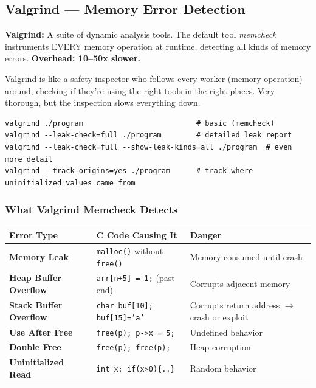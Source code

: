 \documentclass[11pt,a4paper]{article}
\newcommand{\code}[1]{\texttt{\small\colorbox{codebg}{\color{codekw}#1}}}
\newcommand{\term}[1]{\textbf{\color{darkblue}#1}}
\begin{document}
\subsection{Valgrind --- Memory Error Detection}

\begin{mydef}
\textbf{Valgrind:} A suite of dynamic analysis tools. The default tool \textit{memcheck} instruments EVERY memory operation at runtime, detecting all kinds of memory errors. \textbf{Overhead: 10--50x slower.}
\end{mydef}

\begin{analogy}
Valgrind is like a safety inspector who follows every worker (memory operation) around, checking if they're using the right tools in the right places. Very thorough, but the inspection slows everything down.
\end{analogy}

\begin{lstlisting}[style=bashstyle]
valgrind ./program                          # basic (memcheck)
valgrind --leak-check=full ./program        # detailed leak report
valgrind --leak-check=full --show-leak-kinds=all ./program  # even more detail
valgrind --track-origins=yes ./program      # track where uninitialized values came from
\end{lstlisting}

\subsubsection{What Valgrind Memcheck Detects}

\begin{center}
\begin{tabular}{L{4.5cm} L{4cm} L{5cm}}
\toprule
\textbf{Error Type} & \textbf{C Code Causing It} & \textbf{Danger} \\
\midrule
\term{Memory Leak} & \code{malloc()} without \code{free()} & Memory consumed until crash \\[4pt]
\term{Heap Buffer Overflow} & \code{arr[n+5] = 1;} (past end) & Corrupts adjacent memory \\[4pt]
\term{Stack Buffer Overflow} & \code{char buf[10]; buf[15]='a'} & Corrupts return address $\to$ crash or exploit \\[4pt]
\term{Use After Free} & \code{free(p); p->x = 5;} & Undefined behavior \\[4pt]
\term{Double Free} & \code{free(p); free(p);} & Heap corruption \\[4pt]
\term{Uninitialized Read} & \code{int x; if(x>0)\{..\}} & Random behavior \\
\bottomrule
\end{tabular}
\end{center}
\end{document}
